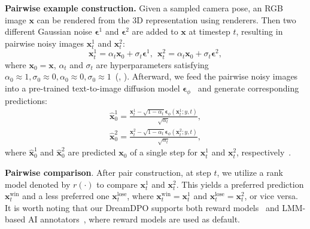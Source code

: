 \textbf{Pairwise example construction.} Given a sampled camera pose, an RGB image $\mathbf{x}$ can be rendered from the 3D representation using renderers. Then two different Gaussian noise $\bm{\epsilon}^1$ and $\bm{\epsilon}^2$ are added to $\mathbf{x}$ at timestep $t$, resulting in pairwise noisy images $\mathbf{x}_t^1$ and $\mathbf{x}_t^2$:
\begin{equation}
    \mathbf{x}_t^1 = \alpha_t \mathbf{x}_0 + \sigma_t \bm{\epsilon}^1, \ \ \mathbf{x}_t^2 = \alpha_t \mathbf{x}_0 + \sigma_t \bm{\epsilon}^2,
\end{equation}
where $\mathbf{x}_0 = \mathbf{x}$, $\alpha_t$ and $\sigma_t$ are hyperparameters satisfying $\alpha_0 \approx 1, \sigma_0 \approx 0, \alpha_0 \approx 0, \sigma_0 \approx 1$~(\cf, \citep{sohl2015deep,ho2020denoising}). Afterward, we feed the pairwise noisy images into a pre-trained text-to-image diffusion model $\bm{\epsilon}_\phi$~\citep{shi2023mvdream,rombach2022high} and generate corresponding predictions:
\begin{equation}
    \begin{aligned}
       \hat{\mathbf{x}}_0^1 = \frac{\mathbf{x}_t^1 - \sqrt{1 - \alpha_t}\bm{\epsilon}_\phi(\mathbf{x}_t^1;y,t)}{\sqrt{\alpha_t}},  \\
       \hat{\mathbf{x}}_0^2 = \frac{\mathbf{x}_t^2 - \sqrt{1 - \alpha_t}\bm{\epsilon}_\phi(\mathbf{x}_t^2;y,t)}{\sqrt{\alpha_t}},
    \end{aligned}
\end{equation}
where $\hat{\mathbf{x}}_0^1$ and $\hat{\mathbf{x}}_0^2$ are predicted $\mathbf{x}_0$ of a single step for $\mathbf{x}_t^1$ and $\mathbf{x}_t^2$, respectively~\citep{song2020denoising}.

\textbf{Pairwise comparison}. After pair construction, at step $t$, we utilize a rank model denoted by $r(\cdot)$ to compare $\mathbf{x}_t^1$ and $\mathbf{x}_t^2$. This yields a preferred prediction $\mathbf{x}_t^{\text{win}}$ and a less preferred one $\mathbf{x}_t^{\text{lose}}$, where $\mathbf{x}_t^{\text{win}}=\mathbf{x}_t^1$ and $\mathbf{x}_t^{\text{lose}}=\mathbf{x}_t^2$, or vice versa. It is worth noting that our DreamDPO supports both reward models~\citep{xu2024imagereward,wu2023human} and LMM-based AI annotators~\citep{bai2023qwen,yang2023dawn}, where reward models are used as default.


